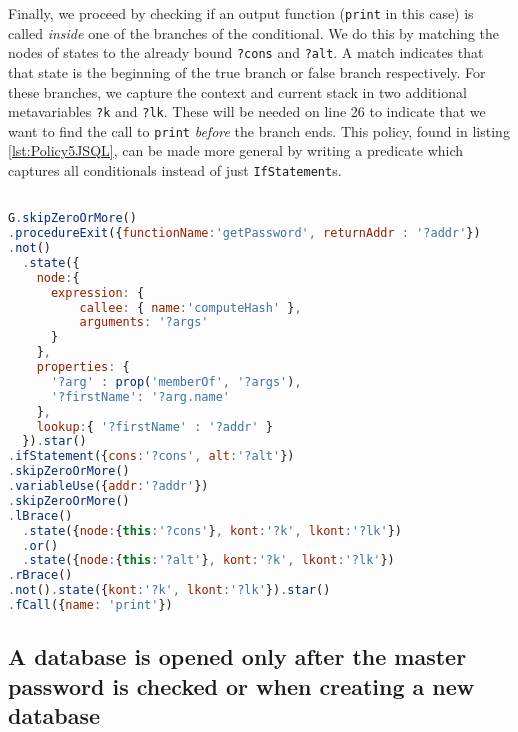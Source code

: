 Finally, we proceed by checking if an output function (\texttt{print} in this case) is called \textit{inside} one of the branches of the conditional. We do this by matching the nodes of states to the already bound \texttt{?cons} and \texttt{?alt}. A match indicates that that state is the beginning of the true branch or false branch respectively. For these branches, we capture the context and current stack in two additional metavariables \texttt{?k} and \texttt{?lk}. These will be needed on line 26 to indicate that we want to find the call to \texttt{print} \textit{before} the branch ends. This policy, found in listing \ref{lst:Policy5JSQL}, can be made more general by writing a predicate which captures all conditionals instead of just \texttt{IfStatement}s.

\begin{lstlisting}[label={lst:Policy5JSQL},language=JavaScript,caption=Policy 5 in JSQL,mathescape=true]  % float=t?

G.skipZeroOrMore()
.procedureExit({functionName:'getPassword', returnAddr : '?addr'})
.not()
  .state({
    node:{  
      expression: {
          callee: { name:'computeHash' },
          arguments: '?args'
      }
    },
    properties: {
      '?arg' : prop('memberOf', '?args'),
      '?firstName': '?arg.name'
    },
    lookup:{ '?firstName' : '?addr' }
  }).star()
.ifStatement({cons:'?cons', alt:'?alt'})
.skipZeroOrMore()
.variableUse({addr:'?addr'})
.skipZeroOrMore()
.lBrace()
  .state({node:{this:'?cons'}, kont:'?k', lkont:'?lk'})
  .or()
  .state({node:{this:'?alt'}, kont:'?k', lkont:'?lk'})
.rBrace()
.not().state({kont:'?k', lkont:'?lk'}).star()
.fCall({name: 'print'})
\end{lstlisting}
 


\subsection{A database is opened only after the master password
is checked or when creating a new database}
\label{subsec:DBOpen}

